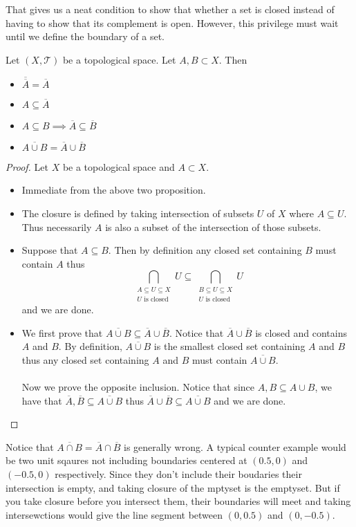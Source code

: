 That gives us a neat condition to show that whether a set is closed instead of having to show that its complement is open. However, this privilege must wait until we define the boundary of a set. 

\begin{prp}{}{} Let $(X,\mathcal{T})$ be a topological space. Let $A,B\subset X$. Then 
\begin{itemize}
\item $\overline{\overline{A}}=\overline{A}$
\item $A\subseteq\overline{A}$
\item $A\subseteq B\implies\overline{A}\subseteq\overline{B}$
\item $\overline{A\cup B}=\overline{A}\cup\overline{B}$
\end{itemize}\tcbline
\begin{proof} Let $X$ be a topological space and $A\subset X$. 
\begin{itemize}
\item Immediate from the above two proposition. 
\item The closure is defined by taking intersection of subsets $U$ of $X$ where $A\subseteq U$. Thus necessarily $A$ is also a subset of the intersection of those subsets. 
\item Suppose that $A\subseteq B$. Then by definition any closed set containing $B$ must contain $A$ thus $$\bigcap_{\substack{A\subseteq U\subseteq X\\U\text{ is closed}}}U\subseteq\bigcap_{\substack{B\subseteq U\subseteq X\\U\text{ is closed}}}U$$ and we are done. 
\item We first prove that $\overline{A\cup B}\subseteq\overline{A}\cup\overline{B}$. Notice that $\overline{A}\cup\overline{B}$ is closed and contains $A$ and $B$. By definition, $\overline{A\cup B}$ is the smallest closed set containing $A$ and $B$ thus any closed set containing $A$ and $B$ must contain $\overline{A\cup B}$. \\~\\
Now we prove the opposite inclusion. Notice that since $A,B\subseteq A\cup B$, we have that $\overline{A},\overline{B}\subseteq\overline{A\cup B}$ thus $\overline{A}\cup\overline{B}\subseteq\overline{A\cup B}$ and we are done. 
\end{itemize}
\end{proof}
\end{prp}

Notice that $\overline{A \cap B}=\overline{A}\cap\overline{B}$ is generally wrong. A typical counter example would be two unit sqaures not including boundaries centered at $(0.5,0)$ and $(-0.5,0)$ respectively. Since they don't include their boudaries their intersection is empty, and taking closure of the mptyset is the emptyset. But if you take closure before you intersect them, their boundaries will meet and taking intersewctions would give the line segment between $(0,0.5)$ and $(0,-0.5)$. \\~\\

